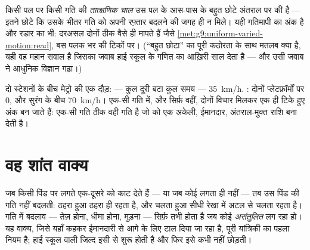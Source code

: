 \begin{definition}[तात्क्षणिक चाल]\label{def:g9:uniform-varied-motion:instant}
किसी पल पर किसी गति की \emph{तात्क्षणिक चाल}
उस पल के आस-पास के बहुत छोटे अंतराल पर की  है --- इतने छोटे कि
उसके भीतर गति को अपनी रफ़्तार बदलने की जगह ही न मिले। यही गतिमापी का
अंक है और रडार का भी: दरअसल दोनों ठीक वैसे ही मापते हैं जैसे
\cref{met:g9:uniform-varied-motion:read}, बस पलक भर की टिकों पर।
(``बहुत छोटा'' का पूरी कठोरता के साथ मतलब क्या है, यही वह महान सवाल है
जिसका जवाब हाई स्कूल के गणित का आख़िरी साल देता है --- और उसी जवाब ने
आधुनिक विज्ञान गढ़ा।)
\end{definition}

\begin{example}\label{ex:g9:uniform-varied-motion:sidebyside}
दो स्टेशनों के बीच मेट्रो की एक दौड़:  --- कुल दूरी बटा कुल समय
--- \qty{35}{km/h}. : दोनों प्लेटफ़ॉर्मों पर $0$, और
सुरंग के बीच \qty{70}{km/h}। एक-सी गति में, और सिर्फ़ वहीं, दोनों
विचार मिलकर एक ही टिके हुए अंक बन जाते हैं: एक-सी गति ठीक वही गति है
जो  को एक अकेली, ईमानदार, अंतराल-मुक्त राशि बना देती है।
\end{example}

\section{वह शांत वाक्य}

\begin{proposition}[संतुलित बल गति को अनछुआ छोड़ देते हैं]\label{prop:g9:uniform-varied-motion:inertia}
जब किसी पिंड पर लगते  एक-दूसरे को काट देते हैं --- या जब कोई  लगता
ही नहीं --- तब उस पिंड की गति नहीं बदलती: ठहरा हुआ ठहरा ही रहता है, और
चलता हुआ सीधी रेखा में अटल  से चलता रहता है। गति में बदलाव --- तेज़
होना, धीमा होना, मुड़ना --- सिर्फ़ तभी होता है जब कोई \emph{असंतुलित}
 लग रहा हो। यह वाक्य, जिसे यहाँ कहकर ईमानदारी से आगे के लिए टाल दिया
जा रहा है, पूरी यांत्रिकी का पहला नियम है; हाई स्कूल वाली जिल्द इसी से
शुरू होती है और फिर इसे कभी नहीं छोड़ती।
\end{proposition}


